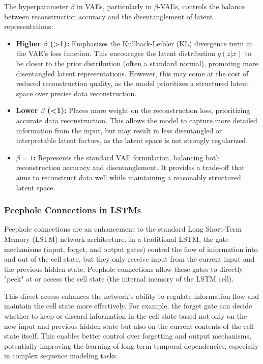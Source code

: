 \documentclass[a4paper]{article}
\begin{document}
\begin{multicols}{2}
The hyperparameter \textbf{$\beta$} in VAEs, particularly in $\beta$-VAEs, controls the balance between reconstruction accuracy and the disentanglement of latent representations:
\begin{itemize}
    \item \textbf{Higher $\beta$ (>1):} Emphasizes the Kullback-Leibler (KL) divergence term in the VAE's loss function. This encourages the latent distribution $q(z|x)$ to be closer to the prior distribution (often a standard normal), promoting more disentangled latent representations. However, this may come at the cost of reduced reconstruction quality, as the model prioritizes a structured latent space over precise data reconstruction.
    \item \textbf{Lower $\beta$ (<1):} Places more weight on the reconstruction loss, prioritizing accurate data reconstruction. This allows the model to capture more detailed information from the input, but may result in less disentangled or interpretable latent factors, as the latent space is not strongly regularized.
    \item \textbf{$\beta = 1$:} Represents the standard VAE formulation, balancing both reconstruction accuracy and disentanglement. It provides a trade-off that aims to reconstruct data well while maintaining a reasonably structured latent space.
\end{itemize}

\subsubsection{Peephole Connections in LSTMs}
Peephole connections are an enhancement to the standard Long Short-Term Memory (LSTM) network architecture. In a traditional LSTM, the gate mechanisms (input, forget, and output gates) control the flow of information into and out of the cell state, but they only receive input from the current input and the previous hidden state. Peephole connections allow these gates to directly "peek" at or access the cell state (the internal memory of the LSTM cell).

This direct access enhances the network's ability to regulate information flow and maintain the cell state more effectively. For example, the forget gate can decide whether to keep or discard information in the cell state based not only on the new input and previous hidden state but also on the current contents of the cell state itself. This enables better control over forgetting and output mechanisms, potentially improving the learning of long-term temporal dependencies, especially in complex sequence modeling tasks.


\end{multicols}
\end{document}
